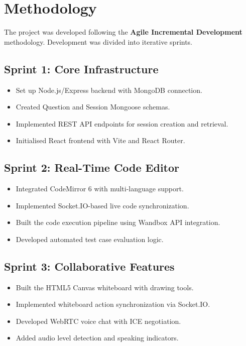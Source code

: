 \documentclass[12pt,a4paper,oneside]{report}
\begin{document}
\section{Methodology}

The project was developed following the \textbf{Agile Incremental Development} methodology. Development was divided into iterative sprints.

\subsection{Sprint 1: Core Infrastructure}
\begin{itemize}
    \item Set up Node.js/Express backend with MongoDB connection.
    \item Created Question and Session Mongoose schemas.
    \item Implemented REST API endpoints for session creation and retrieval.
    \item Initialised React frontend with Vite and React Router.
\end{itemize}

\subsection{Sprint 2: Real-Time Code Editor}
\begin{itemize}
    \item Integrated CodeMirror 6 with multi-language support.
    \item Implemented Socket.IO-based live code synchronization.
    \item Built the code execution pipeline using Wandbox API integration.
    \item Developed automated test case evaluation logic.
\end{itemize}

\subsection{Sprint 3: Collaborative Features}
\begin{itemize}
    \item Built the HTML5 Canvas whiteboard with drawing tools.
    \item Implemented whiteboard action synchronization via Socket.IO.
    \item Developed WebRTC voice chat with ICE negotiation.
    \item Added audio level detection and speaking indicators.
\end{itemize}
\end{document}
